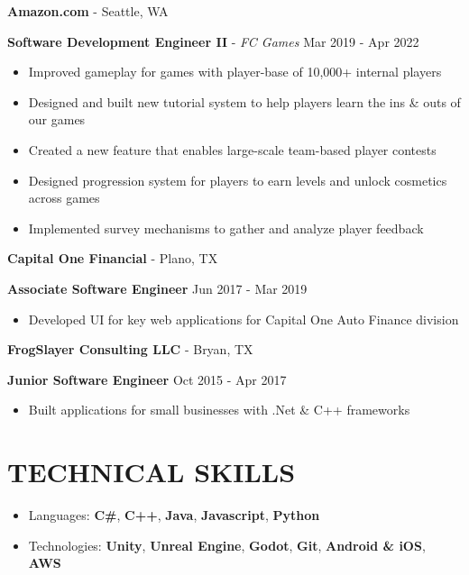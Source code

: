 \documentclass[resmargin,10pt]{res} %
\begin{document}
\begin{resume}
\begin{itemize}
    \end{itemize}
    {\bf Amazon.com} - Seattle, WA \\
    \begin{ncolumn}{1}
        {\bf Software Development Engineer II} - \textit{FC Games}  \hfill Mar 2019 - Apr 2022
    \end{ncolumn}
    \begin{itemize}
        \setlength\itemsep{-0.1em}
        \item Improved gameplay for games with player-base of 10,000+ internal players
        \item Designed and built new tutorial system to help players learn the ins \& outs of our games
        \item Created a new feature that enables large-scale team-based player contests
        \item Designed progression system for players to earn levels and unlock cosmetics across games
        \item Implemented survey mechanisms to gather and analyze player feedback
    \end{itemize}
    {\bf Capital One Financial} - Plano, TX \\
    \begin{ncolumn}{1}
        {\bf Associate Software Engineer} \hfill Jun 2017 - Mar 2019
    \end{ncolumn}
    \begin{itemize}
        \item Developed UI for key web applications for Capital One Auto Finance division
    \end{itemize}
    {\bf FrogSlayer Consulting LLC} - Bryan, TX \\
    \begin{ncolumn}{1}
        {\bf Junior Software Engineer} \hfill Oct 2015 - Apr 2017
    \end{ncolumn}
    \begin{itemize}
        \setlength\itemsep{-0.0em}
        \item  Built applications for small businesses with .Net \& C++ frameworks
    \end{itemize}

    \section{TECHNICAL SKILLS}
    \begin{itemize}
        \setlength\itemsep{0.1em}
        \item[] {\large Languages:} \textbf{C\#}, \textbf{C++}, \textbf{Java}, \textbf{Javascript}, \textbf{Python}
        \item[] {\large Technologies:} \textbf{Unity}, \textbf{Unreal Engine}, \textbf{Godot}, \textbf{Git}, \textbf{Android \& iOS}, \textbf{AWS}
    \end{itemize}

\end{resume}
\end{document}
